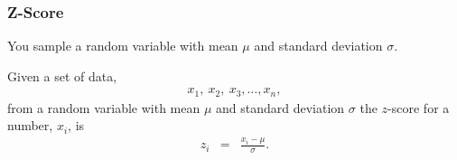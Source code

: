 \begin{frame}
  \frametitle{Z-Score}

  You sample a random variable with mean $\mu$ and standard deviation
  $\sigma$.

  \begin{definition}[Z-Score]
    Given a set of data,
    \begin{eqnarray*}
      x_1,~x_2,~x_3,\ldots,x_n,
    \end{eqnarray*}
    from a random variable with mean $\mu$ and standard deviation
    $\sigma$ the $z$-score for a number, $x_i$, is
    \begin{eqnarray*}
      z_i & = & \frac{x_i-\mu}{\sigma}.
    \end{eqnarray*}
  \end{definition}

\end{frame}


